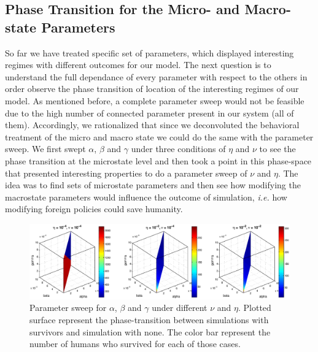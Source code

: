 \documentclass[11pt]{article} %
\begin{document}
\subsection{Phase Transition for the Micro- and Macro-state Parameters }\indent

So far we have treated specific set of parameters, which displayed interesting regimes with different outcomes for our model. The next question is to understand the full dependance of every parameter with respect to the others in order observe the phase transition of location of the interesting regimes of our model. As mentioned before, a complete parameter sweep would not be feasible due to the high number of connected parameter present in our system (all of them). Accordingly, we rationalized that since we deconvoluted the behavioral treatment of the micro and macro state we could do the same with the parameter sweep. We first swept $\alpha$, $\beta$ and $\gamma$ under three conditions of $\eta$ and $\nu$ to see the phase transition at the microstate level and then took a point in this phase-space that presented interesting properties to do a parameter sweep of $\nu$ and $\eta$. The idea was to find sets of microstate parameters and then see how modifying the macrostate parameters would influence the outcome of simulation, \textit{i.e.} how modifying foreign policies could save humanity.
\begin{figure}[h!]
\centerline{
\includegraphics[scale=0.45]{../images/Matlab_figures/a-b-g-sweep.eps}}
\caption{Parameter sweep for $\alpha$, $\beta$ and $\gamma$ under different $\nu$ and $\eta$. Plotted surface represent the phase-transition between simulations with survivors and simulation with none. The color bar represent the number of humans who survived for each of those cases.  \label{a-b-g} }
\end{figure}
\end{document}
